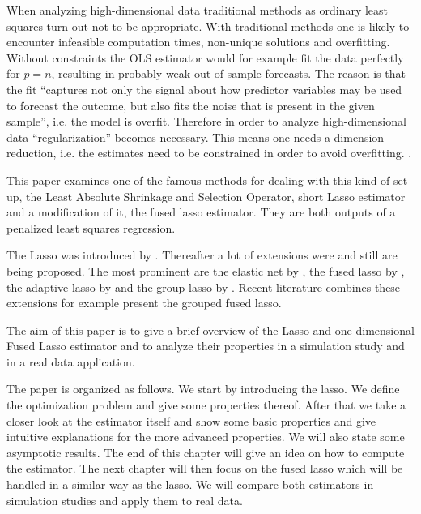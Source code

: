 \documentclass{article}
\theoremstyle{definition}
\begin{document}
When analyzing high-dimensional data traditional methods as ordinary least squares turn out not to be appropriate. With traditional methods one is likely to encounter infeasible computation times, non-unique solutions and overfitting. Without constraints the OLS estimator would for example fit the data perfectly for $p=n$, resulting in probably weak out-of-sample forecasts. The reason is that the fit “captures not only the signal about how predictor variables may be used to forecast the outcome, but also fits the noise that is present in the given sample”, i.e. the model is overfit.
Therefore in order to analyze high-dimensional data “regularization” becomes necessary. This means one needs a dimension reduction, i.e. the estimates need to be constrained in order to avoid overfitting.  \citep{belloni2014}.

This paper examines one of the famous methods for dealing with this kind of set-up, the Least Absolute Shrinkage and Selection Operator, short Lasso estimator and a modification of it, the fused lasso estimator. They are both outputs of a penalized least squares regression.

The Lasso was introduced by \citet{lasso}. Thereafter a lot of extensions were and still are being proposed. The most prominent are the elastic net by \citet{zou2005regularization}, the fused lasso by \citet{fused}, the adaptive lasso by \citet{zou2006adaptive} and  the group lasso by \citet{meier2008group}. Recent literature combines these extensions for example  \citet{bleakley2011group} present the grouped fused lasso.

The aim of this paper is to give a brief overview of the Lasso and one-dimensional Fused Lasso estimator and to analyze their properties in a simulation study and in a real data application. 

The paper is organized as follows. We start by introducing the lasso. We define the optimization problem and give some properties thereof. After that we take a closer look at the estimator itself and show some basic properties and give intuitive explanations for the more advanced properties. We will also state some asymptotic results. The end of this chapter will give an idea on how to compute the estimator. The next chapter will then focus on the fused lasso which will be handled in a similar way as the lasso. We will compare both estimators in simulation studies and apply them to real data.
\end{document}
